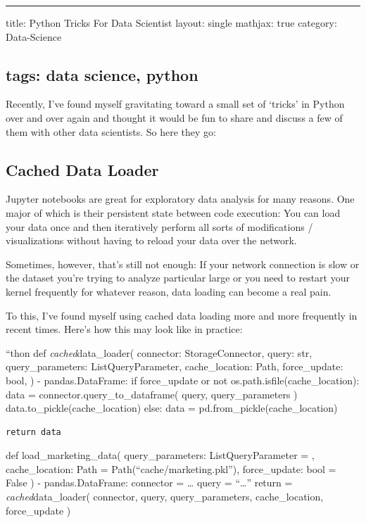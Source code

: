 \documentclass{article}
\begin{document}
\vspace{.5em} \hrule \vspace{.5em}
title: Python Tricks For Data Scientist layout: single mathjax: true category: Data-Science

\hypertarget{tags_data_science_python}{}\subsection*{{tags: data science, python}}\label{tags_data_science_python}

Recently, I've found myself gravitating toward a small set of `tricks' in Python over and over again and thought it would be fun to share and discuss a few of them with other data scientists. So here they go:

\hypertarget{cached_data_loader}{}\subsection*{{Cached Data Loader}}\label{cached_data_loader}

Jupyter notebooks are great for exploratory data analysis for many reasons. One major of which is their persistent state between code execution: You can load your data once and then iteratively perform all sorts of modifications / visualizations without having to reload your data over the network.

Sometimes, however, that's still not enough: If your network connection is slow or the dataset you're trying to analyze particular large or you need to restart your kernel frequently for whatever reason, data loading can become a real pain.

To this, I've found myself using cached data loading more and more frequently in recent times. Here's how this may look like in practice:

``thon def \emph{cached}data\_loader( connector: StorageConnector, query: str, query\_parameters: ListQueryParameter, cache\_location: Path, force\_update: bool, ) -{\tt {}} pandas.DataFrame: if force\_update or not os.path.isfile(cache\_location): data = connector.query\_to\_dataframe( query, query\_parameters ) data.to\_pickle(cache\_location) else: data = pd.from\_pickle(cache\_location)

\begin{verbatim}return data\end{verbatim}
def load\_marketing\_data( query\_parameters: ListQueryParameter = , cache\_location: Path = Path(``cache/marketing.pkl''), force\_update: bool = False ) -{\tt {}} pandas.DataFrame: connector = \ldots{} query = ``\ldots{}'' return = \emph{cached}data\_loader( connector, query, query\_parameters, cache\_location, force\_update )
\end{document}
